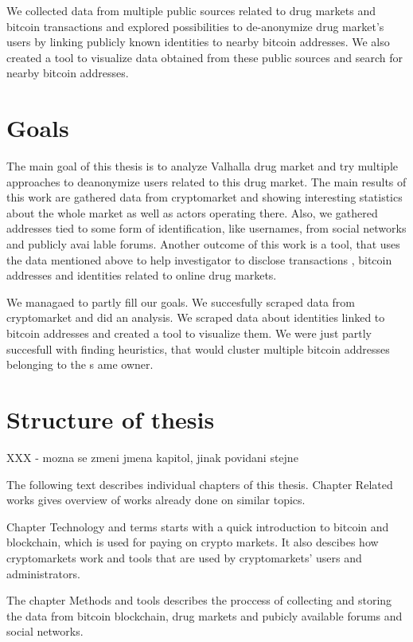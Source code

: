 \documentclass[
  digital, %
  table,   %
  lof,     %
  lot,     %
  oneside
]{fithesis3}
\begin{document}
We collected data from multiple public sources related to drug markets and bitcoin transactions and explored
 possibilities to de-anonymize drug market's users by linking publicly known identities to nearby bitcoin addresses.
We also created a tool to visualize data obtained from these public sources and search for nearby bitcoin addresses.

\section{Goals}

The main goal of this thesis is to analyze Valhalla drug market
and try multiple approaches to deanonymize users related to this drug market.
The main results of this work are gathered data from cryptomarket and
 showing interesting statistics about the whole market as well as actors operating there.
 Also, we gathered addresses tied to some form of identification, like usernames, from social networks and publicly avai
lable forums.
Another outcome of this work is a tool, that uses the data mentioned above to help investigator to disclose transactions
,
bitcoin addresses and identities related to online drug markets.

We managaed to partly fill our goals. We succesfully scraped data from cryptomarket and did an analysis.
We scraped data about identities linked to bitcoin addresses and created a tool to visualize them.
We were just partly succesfull with finding heuristics, that would cluster multiple bitcoin addresses belonging to the s
ame owner.

\section{Structure of thesis}
XXX - mozna se zmeni jmena kapitol, jinak povidani stejne

The following text describes individual chapters of this thesis.
Chapter Related works gives overview of works already done on similar topics. 

Chapter Technology and terms starts with a quick introduction to bitcoin and blockchain,
which is used for paying on crypto markets.
It also descibes how cryptomarkets work and tools that are used by cryptomarkets' users and administrators.

The chapter Methods and tools describes the proccess of collecting and storing the data from bitcoin blockchain,
drug markets and pubicly available forums and social networks. 
\end{document}

